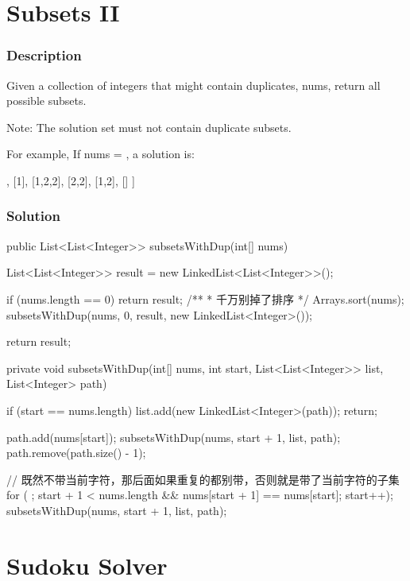 \section{Subsets II} %

\subsubsection{Description}
Given a collection of integers that might contain duplicates, nums, return all possible subsets.

Note: The solution set must not contain duplicate subsets.

For example,
If nums = \code{[1,2,2]}, a solution is:

\begin{Code}
[
  [2],
  [1],
  [1,2,2],
  [2,2],
  [1,2],
  []
]
\end{Code}

\subsubsection{Solution}

\begin{Code}
public List<List<Integer>> subsetsWithDup(int[] nums) {
    List<List<Integer>> result = new LinkedList<List<Integer>>();

    if (nums.length == 0) {
        return result;
    }
    /**
     * 千万别掉了排序
     */
    Arrays.sort(nums);
    subsetsWithDup(nums, 0, result, new LinkedList<Integer>());

    return result;
}

private void subsetsWithDup(int[] nums, int start, List<List<Integer>> list, List<Integer> path) {
    if (start == nums.length) {
        list.add(new LinkedList<Integer>(path));
        return;
    }

    path.add(nums[start]);
    subsetsWithDup(nums, start + 1, list, path);
    path.remove(path.size() - 1);

    // 既然不带当前字符，那后面如果重复的都别带，否则就是带了当前字符的子集
    for ( ; start + 1 < nums.length && nums[start + 1] == nums[start]; start++);
    subsetsWithDup(nums, start + 1, list, path);
}
\end{Code}

\newpage

\section{Sudoku Solver} %

